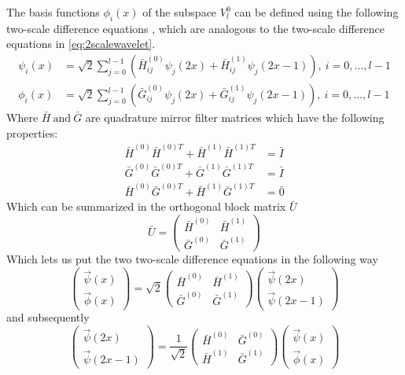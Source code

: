 \documentclass[../master_thesis.tex]{subfiles}
\begin{document}
 The basis functions $\phi_i(x)$ of the subspace $V_l^0$ can be defined using the following two-scale
difference equations \cite{Beylkin1999AdaptiveSO}, which are analogous to the
two-scale difference equations in \ref{eq:2scalewavelet}.
\begin{align}
  \psi_i(x) &= \sqrt{2}\sum^{l-1}_{j=0}\left(\bar{H}^{(0)}_{ij}\psi_j(2x) + \bar{H}^{(1)}_{ij}\psi_j(2x-1)\right), \ i = 0,...,l-1 \\
  \phi_i(x) &= \sqrt{2}\sum^{l-1}_{j=0}\left(\bar{G}^{(0)}_{ij}\psi_j(2x) + \bar{G}^{(1)}_{ij}\psi_j(2x-1)\right), \ i = 0,...,l-1
\end{align}
Where $ \bar{H} \ \text{and}\ \bar{G} $ are quadrature mirror filter matrices \cite{Beylkin1999AdaptiveSO} which have
the following properties:
\begin{align}
  \bar{H}^{(0)}\bar{H}^{(0)T} + \bar{H}^{(1)}\bar{H}^{(1)T} &= \bar{I} \\
  \bar{G}^{(0)}\bar{G}^{(0)T} + \bar{G}^{(1)}\bar{G}^{(1)T} &= \bar{I} \\
  \bar{H}^{(0)}\bar{G}^{(0)T} + \bar{H}^{(1)}\bar{G}^{(1)T} &= \bar{0}
\end{align}
Which can be summarized in the orthogonal block matrix $\bar{U}$ \cite{Beylkin1999AdaptiveSO}
\begin{equation}
  \bar{U} =
  \begin{pmatrix}
    \bar{H}^{(0)} & \bar{H}^{(1)} \\
    \bar{G}^{(0)} & \bar{G}^{(1)}
  \end{pmatrix}
\end{equation}
Which lets us put the two two-scale difference equations in the following way \cite{Sorland}
\begin{equation}
  \begin{pmatrix}
    \vec{\psi}(x) \\
    \vec{\phi}(x)
  \end{pmatrix}
  = \sqrt{2}
  \begin{pmatrix}
    \bar{H}^{(0)} & \bar{H}^{(1)} \\
    \bar{G}^{(0)} & \bar{G}^{(1)}
  \end{pmatrix}
  \begin{pmatrix}
    \vec{\psi}(2x) \\
    \vec{\psi}(2x-1)
  \end{pmatrix}
\end{equation}
and subsequently
\begin{equation}
  \begin{pmatrix}
    \vec{\psi}(2x) \\
    \vec{\psi}(2x-1)
  \end{pmatrix}
  = \frac{1}{\sqrt{2}}
  \begin{pmatrix}
    \bar{H}^{(0)} & \bar{G}^{(0)} \\
    \bar{H}^{(1)} & \bar{G}^{(1)}
  \end{pmatrix}
  \begin{pmatrix}
    \vec{\psi}(x) \\
    \vec{\phi}(x)
  \end{pmatrix}
\end{equation}
\end{document}
